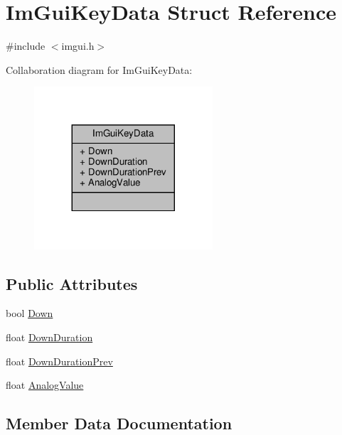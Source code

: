 \hypertarget{structImGuiKeyData}{}\section{Im\+Gui\+Key\+Data Struct Reference}
\label{structImGuiKeyData}


{\ttfamily \#include $<$imgui.\+h$>$}



Collaboration diagram for Im\+Gui\+Key\+Data\+:
\nopagebreak
\begin{figure}[H]
\begin{center}
\leavevmode
\includegraphics[width=188pt]{structImGuiKeyData__coll__graph}
\end{center}
\end{figure}
\subsection*{Public Attributes}
\begin{DoxyCompactItemize}
\item 
bool \hyperlink{structImGuiKeyData_a19d68bb25ef2f7f384564ca155afb028}{Down}
\item 
float \hyperlink{structImGuiKeyData_a54e78495804cdf28458762bad06dc0ac}{Down\+Duration}
\item 
float \hyperlink{structImGuiKeyData_a3adf13e47cc5db980332aff9012975d8}{Down\+Duration\+Prev}
\item 
float \hyperlink{structImGuiKeyData_adc039f599a1385e1572d741641731ee7}{Analog\+Value}
\end{DoxyCompactItemize}


\subsection{Member Data Documentation}
\mbox{\label{structImGuiKeyData_adc039f599a1385e1572d741641731ee7}} 
